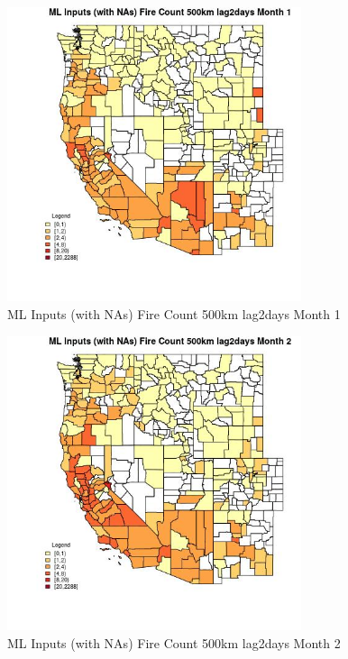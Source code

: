 \begin{figure} 
\centering  
\includegraphics[width=0.77\textwidth]{Code_Outputs/Report_ML_input_PM25_Step4_part_e_de_duplicated_aves_compiled_2019-05-20wNAs_CountyFire_Count_500km_lag2daysmedianMonth1.jpg} 
\caption{\label{fig:Report_ML_input_PM25_Step4_part_e_de_duplicated_aves_compiled_2019-05-20wNAsCountyFire_Count_500km_lag2daysmedianMonth1}ML Inputs (with NAs) Fire Count 500km lag2days Month 1} 
\end{figure} 
 

\begin{figure} 
\centering  
\includegraphics[width=0.77\textwidth]{Code_Outputs/Report_ML_input_PM25_Step4_part_e_de_duplicated_aves_compiled_2019-05-20wNAs_CountyFire_Count_500km_lag2daysmedianMonth2.jpg} 
\caption{\label{fig:Report_ML_input_PM25_Step4_part_e_de_duplicated_aves_compiled_2019-05-20wNAsCountyFire_Count_500km_lag2daysmedianMonth2}ML Inputs (with NAs) Fire Count 500km lag2days Month 2} 
\end{figure} 
 


